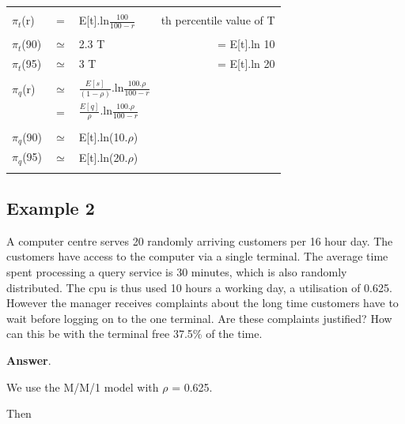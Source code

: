 \documentclass[12pt,fleqn]{report}
\begin{document}
\begin{center}
\begin{tabular}{|| l c l r ||}
\hline
         &&&\\
$\pi_t$(r) & = & E[t].ln$\frac{100}{100-r}$ & \hspace*{0.5in}{\it r}th percentile value of T\\
           &   &  &\\
$\pi_t$(90) & $\simeq$ & 2.3 T        & = E[t].ln 10\\
$\pi_t$(95) & $\simeq$ & 3 T          & = E[t].ln 20\\
            &          &              & \\
$\pi_q$(r) & $\simeq$  & 
         $\frac{E[s]}{(1-\rho)}$.ln$\frac{100.\rho}{100-r}$ &\\[0.1in]
            & = &      $\frac{E[q]}{\rho}$.ln$\frac{100.\rho}{100-r}$ &\\
&&&\\
$\pi_q$(90) & $\simeq$ & E[t].ln(10.$\rho$) & \\
$\pi_q$(95) & $\simeq$ & E[t].ln(20.$\rho$) & \\
            &&&\\
\hline
\end{tabular}
\end{center}


\subsection*{Example 2}

A computer centre serves 20 randomly arriving customers 
per 16 hour day.
The customers have access to the computer via a single terminal.
The average time spent processing a query service is 30 minutes,
which is also randomly distributed.
The cpu is thus used 10 hours a working day, a utilisation of  0.625.
However the manager receives complaints about the long time customers have
to wait before logging on to the one terminal.
Are these complaints justified? How can this be with the terminal free
37.5\% of the time.

\noindent
{\bf Answer}.

We use the  M/M/1 model with $\rho$ = 0.625.

Then 
\end{document}
